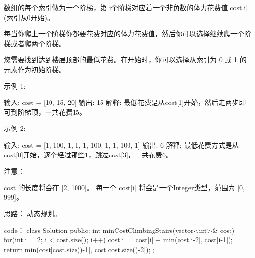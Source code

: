 数组的每个索引做为一个阶梯，第 i个阶梯对应着一个非负数的体力花费值 cost[i](索引从0开始)。

每当你爬上一个阶梯你都要花费对应的体力花费值，然后你可以选择继续爬一个阶梯或者爬两个阶梯。

您需要找到达到楼层顶部的最低花费。在开始时，你可以选择从索引为 0 或 1 的元素作为初始阶梯。

示例 1:

输入: cost = [10, 15, 20]
输出: 15
解释: 最低花费是从cost[1]开始，然后走两步即可到阶梯顶，一共花费15。

 示例 2:

输入: cost = [1, 100, 1, 1, 1, 100, 1, 1, 100, 1]
输出: 6
解释: 最低花费方式是从cost[0]开始，逐个经过那些1，跳过cost[3]，一共花费6。

注意：

    cost 的长度将会在 [2, 1000]。
    每一个 cost[i] 将会是一个Integer类型，范围为 [0, 999]。






























思路：
动态规划。


























code：
class Solution {
public:
    int minCostClimbingStairs(vector<int>& cost) {
        for(int i = 2; i < cost.size(); i++)
                cost[i] = cost[i] + min(cost[i-2], cost[i-1]);
        return min(cost[cost.size()-1], cost[cost.size()-2]);
    }
};